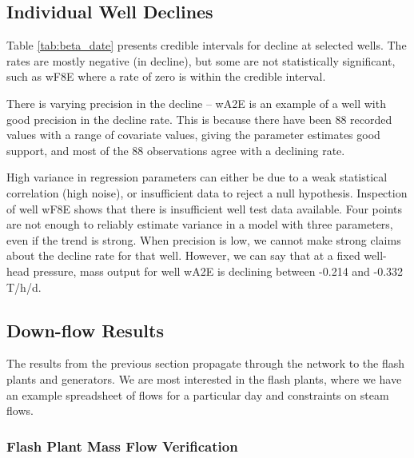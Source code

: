 \documentclass[a4paper, 12pt]{article}
\begin{document}
\subsection{Individual Well Declines}



Table \ref{tab:beta_date} presents credible intervals for decline at selected wells. The rates are mostly negative (in decline), but some are not statistically significant, such as wF8E where a rate of zero is within the credible interval.

There is varying precision in the decline -- wA2E is an example of a well with good precision in the decline rate. This is because there have been 88 recorded values with a range of covariate values, giving the parameter estimates good support, and most of the 88 observations agree with a declining rate.

High variance in regression parameters can either be due to a weak statistical correlation (high noise), or insufficient data to reject a null hypothesis. Inspection of well wF8E shows that there is insufficient well test data available. Four points are not enough to reliably estimate variance in a model with three parameters, even if the trend is strong. When precision is low, we cannot make strong claims about the decline rate for that well. However, we can say that at a fixed well-head pressure, mass output for well wA2E is declining between -0.214 and -0.332 T/h/d.


\subsection{Down-flow Results} \label{sec:downflow}
The results from the previous section propagate through the network to the flash plants and generators. We are most interested in the flash plants, where we have an example spreadsheet of flows for a particular day and constraints on steam flows.

\subsubsection{Flash Plant Mass Flow Verification}
\end{document}
